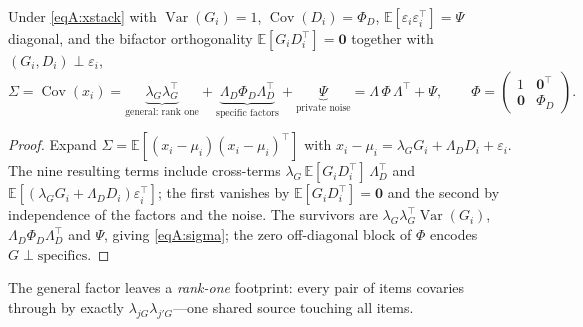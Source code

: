 \begin{proposition}\label{propA:sigma}
Under \eqref{eqA:xstack} with $\operatorname{Var}(G_i)=1$,
$\operatorname{Cov}(D_i)=\Phi_D$, $\mathbb E[\varepsilon_i\varepsilon_i^\top]=\Psi$
diagonal, and the bifactor orthogonality $\mathbb E[G_iD_i^\top]=\mathbf 0$ together
with $(G_i,D_i)\perp\varepsilon_i$,
\begin{equation}
  \Sigma=\operatorname{Cov}(x_i)
  =\underbrace{\lambda_G\lambda_G^{\top}}_{\text{general: rank one}}
  +\underbrace{\Lambda_D\Phi_D\Lambda_D^{\top}}_{\text{specific factors}}
  +\underbrace{\Psi}_{\text{private noise}}
  =\Lambda\,\Phi\,\Lambda^{\top}+\Psi,\qquad
  \Phi=\begin{pmatrix}1&\mathbf 0^{\top}\\[1pt] \mathbf 0&\Phi_D\end{pmatrix}.
  \label{eqA:sigma}
\end{equation}
\end{proposition}
\begin{proof}
Expand $\Sigma=\mathbb E[(x_i-\mu_i)(x_i-\mu_i)^\top]$ with
$x_i-\mu_i=\lambda_G G_i+\Lambda_D D_i+\varepsilon_i$. The nine resulting terms include
cross-terms $\lambda_G\,\mathbb E[G_iD_i^\top]\,\Lambda_D^\top$ and
$\mathbb E[(\lambda_GG_i+\Lambda_DD_i)\varepsilon_i^\top]$; the first vanishes by
$\mathbb E[G_iD_i^\top]=\mathbf 0$ and the second by independence of the factors and the
noise. The survivors are $\lambda_G\lambda_G^\top\operatorname{Var}(G_i)$,
$\Lambda_D\Phi_D\Lambda_D^\top$ and $\Psi$, giving \eqref{eqA:sigma}; the zero
off-diagonal block of $\Phi$ encodes $G\perp\text{specifics}$.
\end{proof}
The general factor leaves a \emph{rank-one} footprint: every pair of items covaries
through \Gfac{} by exactly $\lambda_{jG}\lambda_{j'G}$---one shared source touching all
items.

